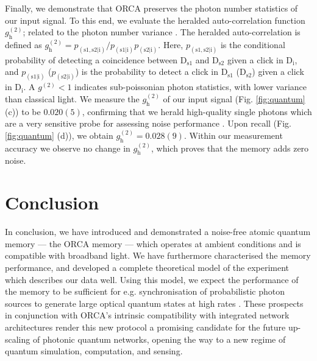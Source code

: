 \documentclass[%
 reprint,
 amsmath,amssymb,
 aps,
 pra,
]{revtex4-1}
\begin{document}
Finally, we demonstrate that ORCA preserves the photon number statistics of our input signal. To this end, we evaluate the heralded auto-correlation function $g^{(2)}_\mathrm{h}$; related to the photon number variance \cite{mandel1979}. The heralded auto-correlation is defined as $g^{(2)}_\mathrm{h}=p_\mathrm{(s1,s2|i)}/p_\mathrm{(s1|i)}p_\mathrm{(s2|i)}$. Here, $p_\mathrm{(s1,s2|i)}$ is the conditional probability of detecting a coincidence between $\mathrm{D_{s1}}$ and $\mathrm{D_{s2}}$ given a click in $\mathrm{D_{i}}$, and $p_\mathrm{(s1|i)}$ ($p_\mathrm{(s2|i)}$) is the probability to detect a click in $\mathrm{D_{s1}}$ ($\mathrm{D_{s2}}$) given a click in $\mathrm{D_{i}}$. A $g^{(2)}<1$ indicates sub-poissonian photon statistics, with lower variance than classical light. We measure the $g_\mathrm{h}^{(2)}$ of our input signal (Fig. \ref{fig:quantum} (c)) to be $0.020(5)$, confirming that we herald high-quality single photons which are a very sensitive probe for assessing noise performance \cite{Michelberger2015}. Upon recall (Fig. \ref{fig:quantum} (d)), we obtain $g_\mathrm{h}^{(2)}=0.028(9)$. Within our measurement accuracy we observe no change in $g_\mathrm{h}^{(2)}$, which proves that the memory adds zero noise.

\section{Conclusion}

In conclusion, we have introduced and demonstrated a noise-free atomic quantum memory --- the ORCA memory --- which operates at ambient conditions and is compatible with broadband light. We have furthermore characterised the memory performance, and developed a complete theoretical model of the experiment which describes our data well. Using this model, we expect the performance of the memory to be sufficient for e.g. synchronisation of probabilistic photon sources to generate large optical quantum states at high rates \cite{Nunn2013}. These prospects in conjunction with ORCA's intrinsic compatibility with integrated network architectures \cite{Sprague2014,Kaczmarek2015} render this new protocol a promising candidate for the future up-scaling of photonic quantum networks, opening the way to a new regime of quantum simulation, computation, and sensing.
\end{document}
